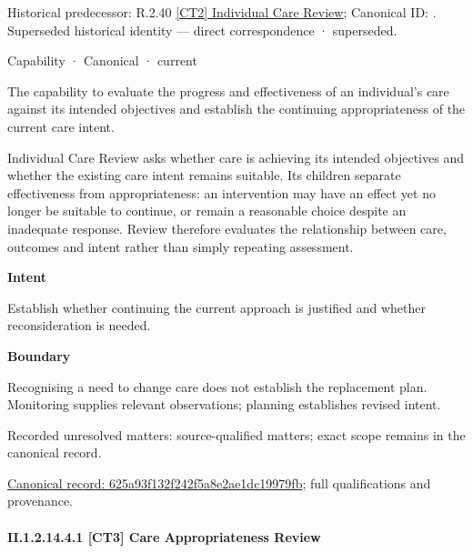 {\small Historical predecessor: R.2.40 \hyperref[element:e1048f6c635d4e16b5384cc2cb45a71b]{[CT2] Individual Care Review}; Canonical ID: \texttt{}. Superseded historical identity — direct correspondence · superseded.}\par
\label{element:625a93f132f242f5a8e2ae1dc19979fb}
{\small Capability · Canonical · current}\par

The capability to evaluate the progress and effectiveness of an individual's care against its intended objectives and establish the continuing appropriateness of the current care intent.



Individual Care Review asks whether care is achieving its intended objectives and whether the existing care intent remains suitable. Its children separate effectiveness from appropriateness: an intervention may have an effect yet no longer be suitable to continue, or remain a reasonable choice despite an inadequate response. Review therefore evaluates the relationship between care, outcomes and intent rather than simply repeating assessment.



\textbf{Intent}



Establish whether continuing the current approach is justified and whether reconsideration is needed.



\textbf{Boundary}



Recognising a need to change care does not establish the replacement plan. Monitoring supplies relevant observations; planning establishes revised intent.


{\small Recorded unresolved matters: source-qualified matters; exact scope remains in the canonical record.}\par
{\footnotesize \href{../../../../../../../continuum/strategy/capability/625a93f132f242f5a8e2ae1dc19979fb.md}{Canonical record: 625a93f132f242f5a8e2ae1dc19979fb}; full qualifications and provenance.}\par
\paragraph*{II.1.2.14.4.1 [CT3] Care Appropriateness Review}
\label{navigation:II.1.2.14.4.1}

